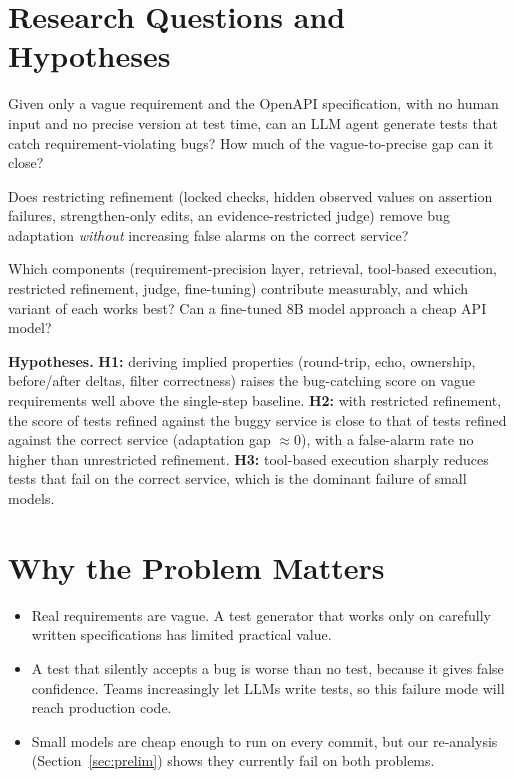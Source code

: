 \documentclass[11pt,a4paper]{article}
\newcommand{\rqlabel}[1]{\textbf{\color{accent}#1}}
\begin{document}
\section{Research Questions and Hypotheses}
\begin{description}[leftmargin=0pt,labelsep=0.4em]
\item[\rqlabel{RQ1 (vague requirements).}] Given only a vague requirement and the OpenAPI specification, with no human input and no precise version at test time, can an LLM agent generate tests that catch requirement-violating bugs? How much of the vague-to-precise gap can it close?
\item[\rqlabel{RQ2 (safe refinement).}] Does restricting refinement (locked checks, hidden observed values on assertion failures, strengthen-only edits, an evidence-restricted judge) remove bug adaptation \emph{without} increasing false alarms on the correct service?
\item[\rqlabel{RQ3 (component value).}] Which components (requirement-precision layer, retrieval, tool-based execution, restricted refinement, judge, fine-tuning) contribute measurably, and which variant of each works best? Can a fine-tuned 8B model approach a cheap API model?
\end{description}
\textbf{Hypotheses.} \textbf{H1:} deriving implied properties (round-trip, echo, ownership, before/after deltas, filter correctness) raises the bug-catching score on vague requirements well above the single-step baseline. \textbf{H2:} with restricted refinement, the score of tests refined against the buggy service is close to that of tests refined against the correct service (adaptation gap $\approx 0$), with a false-alarm rate no higher than unrestricted refinement. \textbf{H3:} tool-based execution sharply reduces tests that fail on the correct service, which is the dominant failure of small models.

\section{Why the Problem Matters}
\begin{itemize}
  \item Real requirements are vague. A test generator that works only on carefully written specifications has limited practical value.
  \item A test that silently accepts a bug is worse than no test, because it gives false confidence. Teams increasingly let LLMs write tests, so this failure mode will reach production code.
  \item Small models are cheap enough to run on every commit, but our re-analysis (Section~\ref{sec:prelim}) shows they currently fail on both problems.
\end{itemize}
\end{document}
